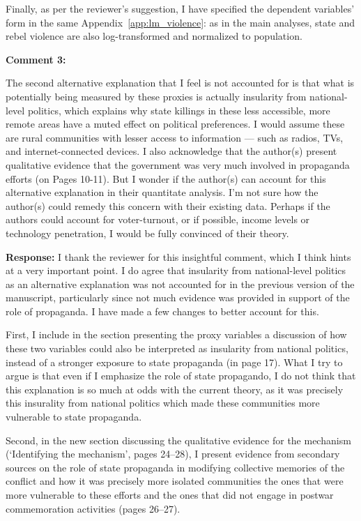 \documentclass[12pt, a4paper, notitlepage]{article}
\begin{document}
Finally, as per the reviewer's suggestion, I have specified the dependent variables' form in the same Appendix~\ref{app:lm_violence}: as in the main analyses, state and rebel violence are also log-transformed and normalized to population.

\vspace{15pt}
\noindent\textbf{Comment 3:}
\begin{displayquote}
The second alternative explanation that I feel is not accounted for is that what is potentially being measured by these proxies is actually insularity from national- level politics, which explains why state killings in these less accessible, more remote areas have a muted effect on political preferences. I would assume these are rural communities with lesser access to information — such as radios, TVs, and internet-connected devices. I also acknowledge that the author(s) present qualitative evidence that the government was very much involved in propaganda efforts (on Pages 10-11). But I wonder if the author(s) can account for this alternative explanation in their quantitate analysis. I’m not sure how the author(s) could remedy this concern with their existing data. Perhaps if the authors could account for voter-turnout, or if possible, income levels or technology penetration, I would be fully convinced of their theory.
\end{displayquote}

\noindent\textbf{Response:} I thank the reviewer for this insightful comment, which I think hints at a very important point. I do agree that insularity from national-level politics as an alternative explanation was not accounted for in the previous version of the manuscript, particularly since not much evidence was provided in support of the role of propaganda. I have made a few changes to better account for this.

First, I include in the section presenting the proxy variables a discussion of how these two variables could also be interpreted as insularity from national politics, instead of a stronger exposure to state propaganda (in page 17). What I try to argue is that even if I emphasize the role of state propagando, I do not think that this explanation is so much at odds with the current theory, as it was precisely this insurality from national politics which made these communities more vulnerable to state propaganda.

Second, in the new section discussing the qualitative evidence for the mechanism (`Identifying the mechanism', pages 24--28), I present evidence from secondary sources on the role of state propaganda in modifying collective memories of the conflict and how it was precisely more isolated communities the ones that were more vulnerable to these efforts and the ones that did not engage in postwar commemoration activities (pages 26--27).
\end{document}
